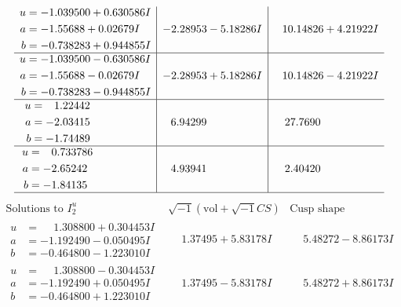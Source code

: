 \documentclass[1p]{elsarticle_modified}
\theoremstyle{definition}
\newcommand{\I}{\sqrt{-1}}
\begin{document}
$$\begin{array}{c|c|c}
\begin{aligned}
u &= -1.039500 + 0.630586 I \\
a &= -1.55688 + 0.02679 I \\
b &= -0.738283 + 0.944855 I\end{aligned}
 & -2.28953 - 5.18286 I & \phantom{-}10.14826 + 4.21922 I \\ \hline\begin{aligned}
u &= -1.039500 - 0.630586 I \\
a &= -1.55688 - 0.02679 I \\
b &= -0.738283 - 0.944855 I\end{aligned}
 & -2.28953 + 5.18286 I & \phantom{-}10.14826 - 4.21922 I \\ \hline\begin{aligned}
u &= \phantom{-}1.22442\phantom{ +0.000000I} \\
a &= -2.03415\phantom{ +0.000000I} \\
b &= -1.74489\phantom{ +0.000000I}\end{aligned}
 & \phantom{-}6.94299\phantom{ +0.000000I} & \phantom{-}27.7690\phantom{ +0.000000I} \\ \hline\begin{aligned}
u &= \phantom{-}0.733786\phantom{ +0.000000I} \\
a &= -2.65242\phantom{ +0.000000I} \\
b &= -1.84135\phantom{ +0.000000I}\end{aligned}
 & \phantom{-}4.93941\phantom{ +0.000000I} & \phantom{-}2.40420\phantom{ +0.000000I}\\
 \hline 
 \end{array}$$\newpage$$\begin{array}{c|c|c}  
\text{Solutions to }I^u_{2}& \I (\text{vol} + \sqrt{-1}CS) & \text{Cusp shape}\\
 \hline 
\begin{aligned}
u &= \phantom{-}1.308800 + 0.304453 I \\
a &= -1.192490 - 0.050495 I \\
b &= -0.464800 - 1.223010 I\end{aligned}
 & \phantom{-}1.37495 + 5.83178 I & \phantom{-}5.48272 - 8.86173 I \\ \hline\begin{aligned}
u &= \phantom{-}1.308800 - 0.304453 I \\
a &= -1.192490 + 0.050495 I \\
b &= -0.464800 + 1.223010 I\end{aligned}
 & \phantom{-}1.37495 - 5.83178 I & \phantom{-}5.48272 + 8.86173 I \\ \hline\begin{aligned}

\end{aligned}
\end{array}$$
\end{document}
